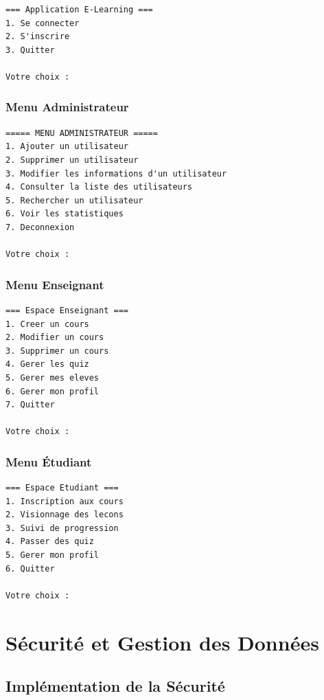 \documentclass[12pt,a4paper]{article}
\begin{document}
\begin{lstlisting}[language={},upquote=true]
=== Application E-Learning ===
1. Se connecter
2. S'inscrire
3. Quitter

Votre choix :
\end{lstlisting}

\subsubsection{Menu Administrateur}

\begin{lstlisting}[language={},upquote=true]
===== MENU ADMINISTRATEUR =====
1. Ajouter un utilisateur
2. Supprimer un utilisateur
3. Modifier les informations d'un utilisateur
4. Consulter la liste des utilisateurs
5. Rechercher un utilisateur
6. Voir les statistiques
7. Deconnexion

Votre choix :
\end{lstlisting}

\subsubsection{Menu Enseignant}

\begin{lstlisting}[language={},upquote=true]
=== Espace Enseignant ===
1. Creer un cours
2. Modifier un cours
3. Supprimer un cours
4. Gerer les quiz
5. Gerer mes eleves
6. Gerer mon profil
7. Quitter

Votre choix :
\end{lstlisting}

\subsubsection{Menu Étudiant}

\begin{lstlisting}[language={},upquote=true]
=== Espace Etudiant ===
1. Inscription aux cours
2. Visionnage des lecons
3. Suivi de progression
4. Passer des quiz
5. Gerer mon profil
6. Quitter

Votre choix :
\end{lstlisting}

\newpage

\section{Sécurité et Gestion des Données}

\subsection{Implémentation de la Sécurité}
\end{document}
